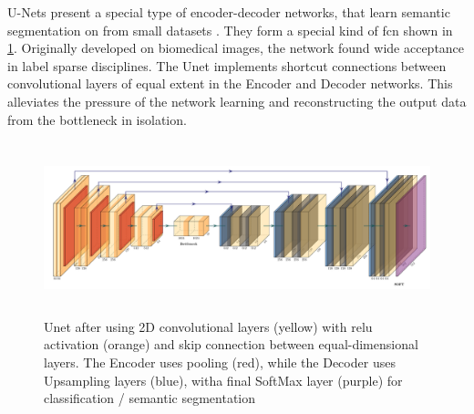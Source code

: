 U-Nets present a special type of encoder-decoder networks, that learn semantic segmentation on from small datasets \citep{ronneberger2015unet}. They form a special kind of \ac{fcn} shown in \cref{fig:unet}. Originally developed on biomedical images, the network found wide acceptance in label sparse disciplines. The Unet implements shortcut connections between convolutional layers of equal extent in the Encoder and Decoder networks. This alleviates the pressure of the network learning and reconstructing the output data from the bottleneck in isolation. 

\begin{figure}
    \centering
    \includegraphics[width=\textwidth,height=5cm,keepaspectratio]{figures/unet.pdf}
    \caption{Unet after \citet{ronneberger2015unet} using 2D convolutional layers (yellow) with \ac{relu} activation (orange) and skip connection between equal-dimensional layers. The Encoder uses pooling (red), while the Decoder uses Upsampling layers (blue), witha final SoftMax layer (purple) for classification / semantic segmentation}
    \label{fig:unet}
\end{figure}